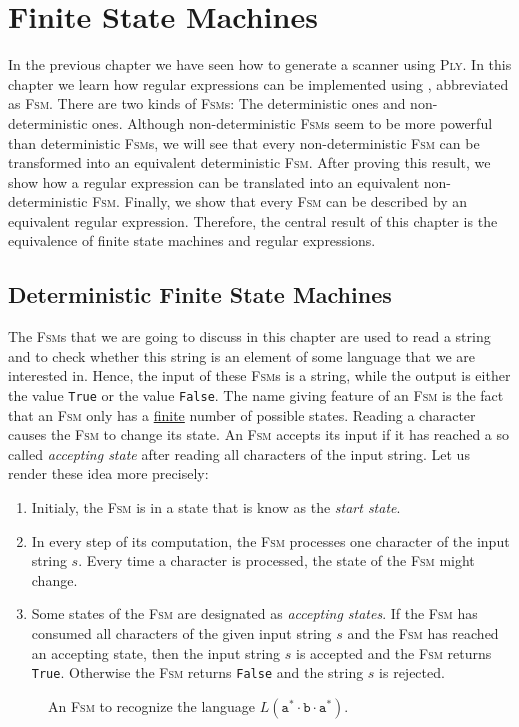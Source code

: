 \chapter{Finite State Machines\label{chapter:finit-state-machines.tex}} 
In the previous chapter we have seen how to generate a scanner using \textsc{Ply}.  In this chapter
we learn how regular expressions can be implemented using ,
abbreviated as \textsc{Fsm}.  There are two kinds of \textsc{Fsm}s: The deterministic ones and
non-deterministic ones.  Although non-deterministic \textsc{Fsm}s seem to be more powerful than
deterministic \textsc{Fsm}s, we will see that every non-deterministic \textsc{Fsm} can be transformed
into an equivalent deterministic \textsc{Fsm}.  After proving this result, we show how a regular
expression can be translated into an equivalent non-deterministic \textsc{Fsm}.  Finally, we show that every
\textsc{Fsm} can be described by an equivalent regular expression.  Therefore, the central result of
this chapter is the equivalence of finite state machines and regular expressions.


\section{Deterministic Finite State Machines}
The \textsc{Fsm}s that we are going to discuss in this chapter are used to read a string and
to check whether this string is an element of some language that we are interested in.  Hence, the input of these 
\textsc{Fsm}s is a string, while the output is either the value \texttt{True} or the value \texttt{False}.
The name giving feature of an \textsc{Fsm} is the fact that an \textsc{Fsm} only has a
\underline{finite} number of possible states.  Reading a character causes the \textsc{Fsm} to change its state.
An \textsc{Fsm} accepts its input if it has reached a so called \emph{accepting state} after reading
all characters of the input string.  Let us render these idea more precisely:
\begin{enumerate}
\item Initialy, the \textsc{Fsm} is in a state that is know as the \emph{start state}.
\item In every step of its computation, the \textsc{Fsm} processes one character of the input string
      $s$.  Every time a character is processed, the state of the \textsc{Fsm} might change.
\item Some states of the \textsc{Fsm} are designated as \emph{accepting states}.  If the
      \textsc{Fsm} has consumed all characters of the given input string $s$ and the \textsc{Fsm}
      has reached an accepting state, then the input string $s$ is accepted and the \textsc{Fsm}
      returns \texttt{True}.  Otherwise the \textsc{Fsm} returns \texttt{False} and the string $s$
      is rejected.
\end{enumerate}
\begin{figure}[!ht]
  \centering
   \caption{An \textsc{Fsm} to recognize the language $L(\texttt{a}^*\cdot\texttt{b}\cdot\texttt{a}^*)$.}
  \label{fig:abstara.dot}
\end{figure}


